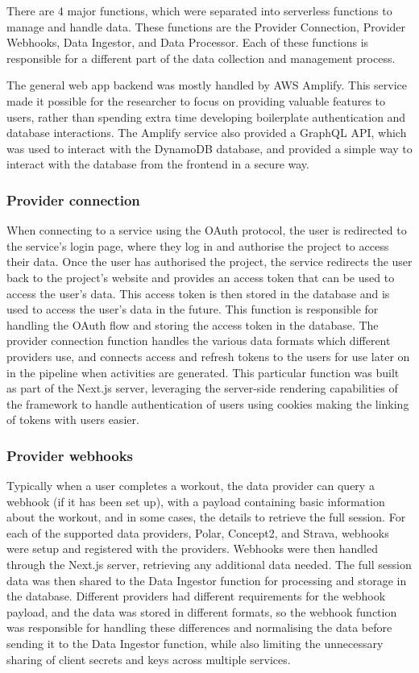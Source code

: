 There are 4 major functions, which were separated into serverless functions to manage and handle data. These functions are the Provider Connection, Provider Webhooks, Data Ingestor, and Data Processor. Each of these functions is responsible for a different part of the data collection and management process.

The general web app backend was mostly handled by AWS Amplify. This service made it possible for the researcher to focus on providing valuable features to users, rather than spending extra time developing boilerplate authentication and database interactions. The Amplify service also provided a GraphQL API, which was used to interact with the DynamoDB database, and provided a simple way to interact with the database from the frontend in a secure way.

\subsubsection{Provider connection}
When connecting to a service using the OAuth protocol, the user is redirected to the service's login page, where they log in and authorise the project to access their data. Once the user has authorised the project, the service redirects the user back to the project's website and provides an access token that can be used to access the user's data. This access token is then stored in the database and is used to access the user's data in the future. This function is responsible for handling the OAuth flow and storing the access token in the database. The provider connection function handles the various data formats which different providers use, and connects access and refresh tokens to the users for use later on in the pipeline when activities are generated. This particular function was built as part of the Next.js server, leveraging the server-side rendering capabilities of the framework to handle authentication of users using cookies making the linking of tokens with users easier.

\subsubsection{Provider webhooks}
Typically when a user completes a workout, the data provider can query a webhook (if it has been set up), with a payload containing basic information about the workout, and in some cases, the details to retrieve the full session. For each of the supported data providers, Polar, Concept2, and Strava, webhooks were setup and registered with the providers. Webhooks were then handled through the Next.js server, retrieving any additional data needed. The full session data was then shared to the Data Ingestor function for processing and storage in the database. Different providers had different requirements for the webhook payload, and the data was stored in different formats, so the webhook function was responsible for handling these differences and normalising the data before sending it to the Data Ingestor function, while also limiting the unnecessary sharing of client secrets and keys across multiple services.

